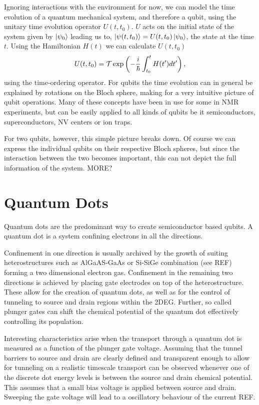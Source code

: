 Ignoring interactions with the environment for now, we can model the time evolution of a quantum mechanical system, and therefore a qubit, using the unitary time evolution operator $U(t,t_0)$. $U$ acts on the initial state of the system given by $\ket{\psi_0}$ leading us to, $\ket{\psi(t,t_0)}=U(t,t_0)\ket{\psi_0}$, the state at the time $t$. Using the Hamiltonian $H(t)$ we can calculate $U(t,t_0)$ 
\begin{equation}
U(t,t_0)=\mathcal{T}\exp \left( - \frac{i}{\hbar} \int_{t_0}^t H(t') dt'  \right),
\end{equation}
using the time-ordering operator. 
For qubits the time evolution can in general be explained by rotations on the Bloch sphere, making for a very intuitive picture of qubit operations. Many of these concepts have been in use for some in NMR experiments, but can be easily applied to all kinds of qubits be it semiconductors, superconductors, NV centers or ion traps.

For two qubits, however, this simple picture breaks down. Of course we can express the individual qubits on their respective Bloch spheres, but since the interaction between the two becomes important, this can not depict the full information of the system. MORE?

\section{Quantum Dots}
Quantum dots are the predominant way to create semiconductor based qubits. A quantum dot is a system confining electrons in all the directions.

Confinement in one direction is usually archived by the growth of suiting heterostructures such as AlGaAS-GaAs or Si-SiGe combination (see REF) forming a two dimensional electron gas. Confinement in the remaining two directions is achieved by placing gate electrodes on top of the heterostructure. These allow for the creation of quantum dots, as well as for the control of tunneling to source and drain regions within the 2DEG. Further, so called plunger gates can shift the chemical potential of the quantum dot effectively controlling its population.

Interesting characteristics arise when the transport through a quantum dot is measured as a function of the plunger gate voltage. Assuming that the tunnel barriers to source and drain are clearly defined and transparent enough to allow for tunneling on a realistic timescale transport can be observed whenever one of the discrete dot energy levels is between the source and drain chemical potential. This assumes that a small bias voltage is applied between source and drain. Sweeping the gate voltage will lead to a oscillatory behaviour of the current REF. 

